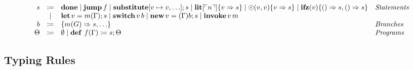 
\begin{definition}
    \[ 
      \begin{array}{r c l l}
        s & \coloneqq & \mathbf{done}  \mid \mathbf{jump}\, f \mid \mathbf{substitute}[v \mapsto v,\ldots];s \mid \mathbf{lit}[\ulcorner n \urcorner]\{ v \Rightarrow s \} \mid \odot(v, v)\{ v \Rightarrow s \} \mid \mathbf{ifz}(v)\{ () \Rightarrow s, () \Rightarrow s \} & \emph{Statements}\\
        & \mid & \mathbf{let}\, v = m(\Gamma); s \mid \mathbf{switch}\, v\, b \mid \mathbf{new}\, v = (\Gamma)b; s \mid \mathbf{invoke}\, v\, m & \\
        b & \coloneqq & \{ m(G) \Rightarrow s, \ldots \} & \emph{Branches}\\
        \Theta & \coloneqq & \emptyset \mid \mathbf{def}\ f(\Gamma) \coloneq s; \Theta & \emph{Programs}\\
      \end{array}
    \]
\end{definition}

\subsection{Typing Rules}
\label{subsec:axcut:typing-rules}

